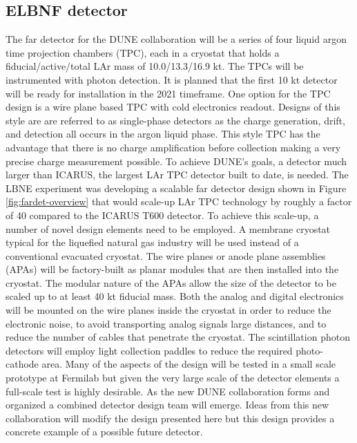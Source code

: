 
\subsection{ELBNF detector}

The far detector for the DUNE collaboration will be a series of four liquid argon time projection chambers (TPC), each in a cryostat that holds a fiducial/active/total LAr mass of 10.0/13.3/16.9 kt. The TPCs will be instrumented with photon detection. It is planned that the first 10 kt detector will be ready for installation in the 2021 timeframe. One option for the TPC design is a wire plane based TPC with cold electronics readout. Designs of this style are are referred to as single-phase detectors as the charge generation, drift, and detection all occurs in the argon liquid phase. This style TPC has the advantage that there is no charge amplification before collection making a very precise charge measurement possible. To achieve DUNE's goals, a detector much larger than ICARUS, the largest LAr TPC detector built to date, is needed. The LBNE experiment was developing a scalable far detector design shown in Figure \ref{fig:fardet-overview} that would scale-up LAr TPC technology by roughly a factor of 40 compared to the ICARUS T600 detector. To achieve this scale-up, a number of novel design elements need to be employed. A membrane cryostat typical for the liquefied natural gas industry will be used instead of a conventional evacuated cryostat. The wire planes or anode plane assemblies (APAs) will be factory-built as planar modules that are then installed into the cryostat. The modular nature of the APAs allow the size of the detector to be scaled up to at least 40 kt fiducial mass. Both the analog and digital electronics will be mounted on the wire planes inside the cryostat in order to reduce the electronic noise, to avoid transporting analog signals large distances, and to reduce the number of cables that penetrate the cryostat. The scintillation photon detectors will employ light collection paddles to reduce the required photo-cathode area. Many of the aspects of the design will be tested in a small scale prototype at Fermilab but given the very large scale of the detector elements a full-scale test is highly desirable. As the new DUNE collaboration forms and organized a combined detector design team will emerge. Ideas from this new collaboration will modify the design presented here but this design provides a concrete example of a possible future detector. 



